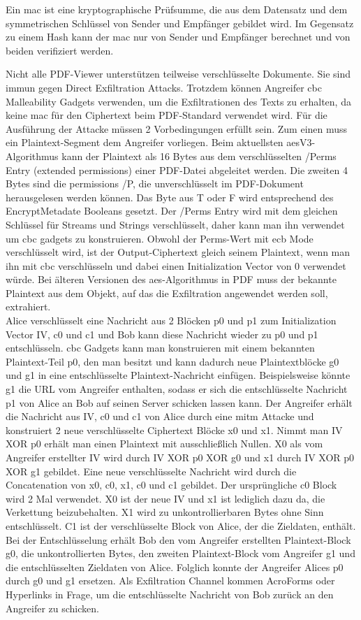 Ein \gls{mac} ist eine kryptographische Prüfsumme, die aus dem Datensatz und dem symmetrischen Schlüssel von Sender und Empfänger gebildet wird. Im Gegensatz zu einem Hash kann der \gls{mac} nur von Sender und Empfänger berechnet und von beiden verifiziert werden. \cite{crypto-web}
\par
Nicht alle PDF-Viewer unterstützen teilweise verschlüsselte Dokumente. Sie sind immun gegen Direct Exfiltration Attacks. Trotzdem können Angreifer \gls{cbc} Malleability Gadgets verwenden, um die Exfiltrationen des Texts zu erhalten, da keine \gls{mac} für den Ciphertext beim PDF-Standard verwendet wird. Für die Ausführung der Attacke müssen 2 Vorbedingungen erfüllt sein. Zum einen muss ein Plaintext-Segment dem Angreifer vorliegen. Beim aktuellsten \gls{aes}V3-Algorithmus kann der Plaintext als 16 Bytes aus dem verschlüsselten /Perms Entry (extended permissions) einer PDF-Datei abgeleitet werden. Die zweiten 4 Bytes sind die permissions /P, die unverschlüsselt im PDF-Dokument herausgelesen werden können. Das Byte aus T oder F wird entsprechend des EncryptMetadate Booleans gesetzt. Der /Perms Entry wird mit dem gleichen Schlüssel für Streams und Strings verschlüsselt, daher kann man ihn verwendet um \gls{cbc} gadgets zu konstruieren. Obwohl der Perms-Wert mit \gls{ecb} Mode verschlüsselt wird, ist der Output-Ciphertext gleich seinem Plaintext, wenn man ihn mit \gls{cbc} verschlüsseln und dabei einen Initialization Vector von 0 verwendet würde. Bei älteren Versionen des \gls{aes}-Algorithmus in PDF muss der bekannte Plaintext aus dem Objekt, auf das die Exfiltration angewendet werden soll, extrahiert. \cite{ccc-break-pdf, pdfex} \\
Alice verschlüsselt eine Nachricht aus 2 Blöcken p0 und p1 zum Initialization Vector IV, c0 und c1 und Bob kann diese Nachricht wieder zu p0 und p1 entschlüsseln. \gls{cbc} Gadgets kann man konstruieren mit einem bekannten Plaintext-Teil p0, den man besitzt und kann dadurch neue Plaintextblöcke g0 und g1 in eine entschlüsselte Plaintext-Nachricht einfügen. Beispielsweise könnte g1 die URL vom Angreifer enthalten, sodass er sich die entschlüsselte Nachricht p1 von Alice an Bob auf seinen Server schicken lassen kann. Der Angreifer erhält die Nachricht aus IV, c0 und c1 von Alice durch eine \gls{mitm} Attacke und konstruiert 2 neue verschlüsselte Ciphertext Blöcke x0 und x1. Nimmt man IV XOR p0 erhält man einen Plaintext mit ausschließlich Nullen. X0 als vom Angreifer erstellter IV wird durch IV XOR p0 XOR g0 und x1 durch IV XOR p0 XOR g1 gebildet. Eine neue verschlüsselte Nachricht wird durch die Concatenation von x0, c0, x1, c0 und c1 gebildet. Der ursprüngliche c0 Block wird 2 Mal verwendet. X0 ist der neue IV und x1 ist lediglich dazu da, die Verkettung beizubehalten. X1 wird zu unkontrollierbaren Bytes ohne Sinn entschlüsselt. C1 ist der verschlüsselte Block von Alice, der die Zieldaten, enthält. Bei der Entschlüsselung erhält Bob den vom Angreifer erstellten Plaintext-Block g0, die unkontrollierten Bytes, den zweiten Plaintext-Block vom Angreifer g1 und die entschlüsselten Zieldaten von Alice. Folglich konnte der Angreifer Alices p0 durch g0 und g1 ersetzen. Als Exfiltration Channel kommen AcroForms oder Hyperlinks in Frage, um die entschlüsselte Nachricht von Bob zurück an den Angreifer zu schicken. \cite{gadget, pdf-insec-gadget, ccc-break-pdf}
